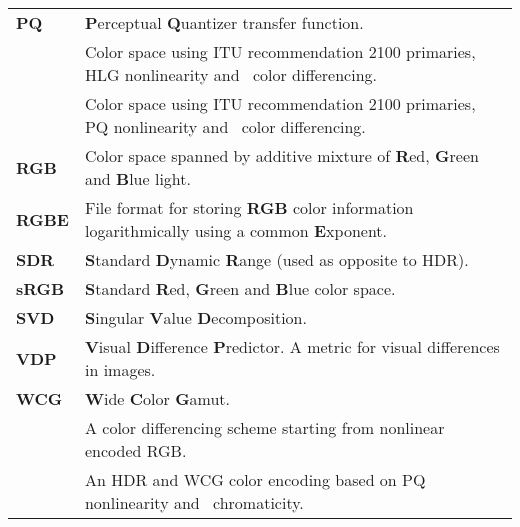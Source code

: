 \begin{flushleft}
\begin{longtable}[c]{@{}p{28.5mm}@{} p{120.5mm}}
	\textbf{PQ}	    & \textbf{P}erceptual \textbf{Q}uantizer transfer function.\\
	\textbf{\RecTTBBC}& Color space using ITU recommendation 2100 primaries, HLG nonlinearity and \YCbCr\ color differencing.\\
	\textbf{\RecTTPQ}& Color space using ITU recommendation 2100 primaries, PQ nonlinearity and \YCbCr\ color differencing.\\
	\textbf{RGB}	& Color space spanned by additive mixture of \textbf{R}ed, \textbf{G}reen and \textbf{B}lue light.\\
	\textbf{RGBE}	& File format for storing \textbf{RGB} color information logarithmically using a common \textbf{E}xponent.\\
	\textbf{SDR}	& \textbf{S}tandard \textbf{D}ynamic \textbf{R}ange (used as opposite to HDR).\\ 
	\textbf{sRGB}	& \textbf{S}tandard \textbf{R}ed, \textbf{G}reen and \textbf{B}lue color space.\\
	\textbf{SVD}	& \textbf{S}ingular \textbf{V}alue \textbf{D}ecomposition.\\
	\textbf{VDP}	& \textbf{V}isual \textbf{D}ifference \textbf{P}redictor. A metric for visual differences in images.\\
	\textbf{WCG}	& \textbf{W}ide \textbf{C}olor \textbf{G}amut.\\
	\textbf{\YCbCr} & A color differencing scheme starting from nonlinear encoded RGB.\\
	\textbf{\YuvDP} & An HDR and WCG color encoding based on PQ nonlinearity and \uv\ chromaticity.\\
\end{longtable}
\end{flushleft}
%
%